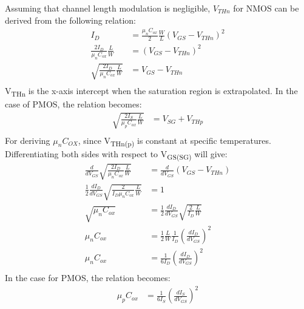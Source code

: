 \documentclass{article}
\begin{document}
\begin{enumerate}[(a)]
Assuming that channel length modulation is negligible, \(V_{THn}\) for NMOS can be derived
from the following relation:
\begin{equation*}
\begin{aligned}
I_{D} &= \frac{\mu_{n}C_{ox}}{2} \frac{W}{L} (V_{GS} - V_{THn})^2 \\
\frac{2 I_{D}}{\mu_{n}C_{ox}}\frac{L}{W} &=  (V_{GS} - V_{THn})^2 \\
\sqrt{\frac{2 I_{D}}{\mu_{n}C_{ox}}\frac{L}{W}} &=  V_{GS} - V_{THn} \\
\end{aligned}
\end{equation*}
V\textsubscript{THn} is the x-axis intercept when the saturation region is extrapolated.
In the case of PMOS, the relation becomes:
\begin{equation*}
\begin{aligned}
\sqrt{\frac{2 I_{S}}{\mu_{p}C_{ox}}\frac{L}{W}} &=  V_{SG} + V_{THp} \\
\end{aligned}
\end{equation*}
For deriving \(\mu_{n}C_{OX}\), since V\textsubscript{THn(p)} is constant at specific temperatures.
Differentiating both sides with respect to V\textsubscript{GS(SG)} will give:
\begin{equation*}
\begin{aligned}
\frac{d}{dV_{GS}}\sqrt{\frac{2 I_{D}}{\mu_{n}C_{ox}}\frac{L}{W}} &=  \frac{d}{dV_{GS}}(V_{GS} - V_{THn}) \\
\frac{1}{2} \frac{dI_{D}}{dV_{GS}} \sqrt{\frac{2}{I_{D}\mu_{n}C_{ox}}\frac{L}{W}} &=  1 \\
\sqrt{\mu_{n}C_{ox}} &= \frac{1}{2} \frac{dI_{D}}{dV_{GS}} \sqrt{\frac{2}{I_{D}}\frac{L}{W}} \\
\mu_{n}C_{ox} &= \frac{1}{2} \frac{L}{W} \frac{1}{I_{D}}(\frac{dI_{D}}{dV_{GS}})^{2} \\
\mu_{n}C_{ox} &= \frac{1}{6 I_{D}}(\frac{dI_{D}}{dV_{GS}})^{2} \\
\end{aligned}
\end{equation*}
In the case for PMOS, the relation becomes:
\begin{equation*}
\begin{aligned}
\mu_{p}C_{ox} &= \frac{1}{6 I_{S}}(\frac{dI_{S}}{dV_{GS}})^{2} \\
\end{aligned}
\end{equation*}


\end{enumerate}
\end{document}
